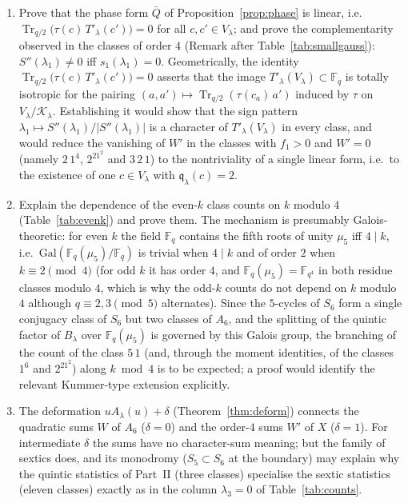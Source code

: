 ﻿\documentclass[12pt,a4paper]{amsart}
\theoremstyle{definition}
\newcommand{\F}{\mathbb{F}}
\newcommand{\Tr}{\operatorname{Tr}}
\newcommand{\Kk}{\mathcal{K}}
\newcommand{\qq}{\mathfrak{q}}
\newcommand{\Spp}{S''}
\begin{document}
\begin{enumerate}[label=\textbf{Open Problem \arabic*.},ref=\arabic*,wide,labelindent=0pt,itemsep=0.8ex]
\item Prove that the phase form $\bar Q$ of Proposition~\ref{prop:phase} is linear, i.e.\ $\Tr_{q/2}\bigl(\tau(c)\,T'_\lambda(c')\bigr)=0$ for all $c,c'\in V_\lambda$; and prove the complementarity observed in the classes of order $4$ (Remark after Table~\ref{tab:smallgauss}): $\Spp(\lambda_1)\ne0$ iff $s_1(\lambda_1)=0$. Geometrically, the identity $\Tr_{q/2}\bigl(\tau(c)\,T'_\lambda(c')\bigr)=0$ asserts that the image $T'_\lambda(V_\lambda)\subset\F_q$ is totally isotropic for the pairing $(a,a')\mapsto\Tr_{q/2}(\tau(c_a)\,a')$ induced by $\tau$ on $V_\lambda/\Kk_\lambda$. Establishing it would show that the sign pattern $\lambda_1\mapsto\Spp(\lambda_1)/|\Spp(\lambda_1)|$ is a character of $T'_\lambda(V_\lambda)$ in every class, and would reduce the vanishing of $W'$ in the classes with $f_1>0$ and $W'=0$ (namely $2\,1^4$, $2^21^2$ and $3\,2\,1$) to the nontriviality of a single linear form, i.e.\ to the existence of one $c\in V_\lambda$ with $\qq_\lambda(c)=2$.
\item Explain the dependence of the even-$k$ class counts on $k$ modulo $4$ (Table~\ref{tab:evenk}) and prove them. The mechanism is presumably Galois-theoretic: for even $k$ the field $\F_q$ contains the fifth roots of unity $\mu_5$ iff $4\mid k$, i.e.\ $\mathrm{Gal}(\F_q(\mu_5)/\F_q)$ is trivial when $4\mid k$ and of order $2$ when $k\equiv2\pmod4$ (for odd $k$ it has order $4$, and $\F_q(\mu_5)=\F_{q^4}$ in both residue classes modulo $4$, which is why the odd-$k$ counts do not depend on $k$ modulo $4$ although $q\equiv2,3\pmod5$ alternates). Since the $5$-cycles of $S_6$ form a single conjugacy class of $S_6$ but two classes of $A_6$, and the splitting of the quintic factor of $B_\lambda$ over $\F_q(\mu_5)$ is governed by this Galois group, the branching of the count of the class $5\,1$ (and, through the moment identities, of the classes $1^6$ and $2^21^2$) along $k\bmod4$ is to be expected; a proof would identify the relevant Kummer-type extension explicitly.
\item The deformation $uA_\lambda(u)+\delta$ (Theorem~\ref{thm:deform}) connects the quadratic sums $W$ of $A_6$ ($\delta=0$) and the order-$4$ sums $W'$ of $X$ ($\delta=1$). For intermediate $\delta$ the sums have no character-sum meaning; but the family of sextics does, and its monodromy ($S_5\subset S_6$ at the boundary) may explain why the quintic statistics of Part~II (three classes) specialise the sextic statistics (eleven classes) exactly as in the column $\lambda_3=0$ of Table~\ref{tab:counts}.
\end{enumerate}
\end{document}
